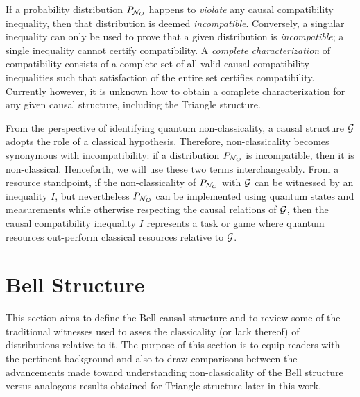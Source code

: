 \documentclass[aps, 10pt, english, twoside, pra, nofootinbib, tightenlines, longbibliography, superscriptaddress]{revtex4-1}
\begin{document}
    If a probability distribution $\prob[\nodes_{O}]$ happens to \textit{violate} any causal compatibility inequality, then that distribution is deemed \textit{incompatible}.  Conversely, a singular inequality can only be used to prove that a given distribution is \textit{incompatible}; a single inequality cannot certify compatibility. A \textit{complete characterization} of compatibility consists of a complete set of all valid causal compatibility inequalities such that satisfaction of the entire set certifies compatibility. Currently however, it is unknown how to obtain a complete characterization for any given causal structure, including the Triangle structure.

    From the perspective of identifying quantum non-classicality, a causal structure $\mathcal{G}$ adopts the role of a classical hypothesis. Therefore, non-classicality becomes synonymous with incompatibility: if a distribution $\prob[\nodes_{O}]$ is incompatible, then it is non-classical. Henceforth, we will use these two terms interchangeably. From a resource standpoint, if the non-classicality of $\prob[\nodes_{O}]$ with $\mathcal{G}$ can be witnessed by an inequality $I$, but nevertheless $\prob[\nodes_{O}]$ can be implemented using quantum states and measurements while otherwise respecting the causal relations of $\mathcal{G}$, then the causal compatibility inequality $I$ represents a task or game where quantum resources out-perform classical resources relative to $\mathcal{G}$.

    \section{Bell Structure}
    \label{sec:bell_structure}
    This section aims to define the Bell causal structure and to review some of the traditional witnesses used to asses the classicality (or lack thereof) of distributions relative to it. The purpose of this section is to equip readers with the pertinent background and also to draw comparisons between the advancements made toward understanding non-classicality of the Bell structure versus analogous results obtained for Triangle structure later in this work.
\end{document}
